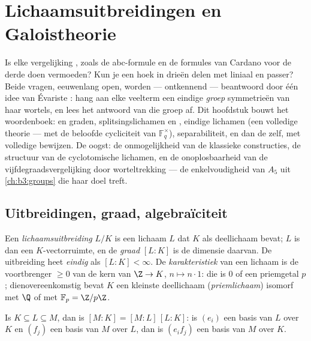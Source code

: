 \chapter{Lichaamsuitbreidingen en Galoistheorie}\label{ch:b3:galois}

Is elke vergelijking , zoals de
abc-formule en de formules van Cardano voor de derde  doen
vermoeden? Kun je een hoek in drieën delen met liniaal en passer?
Beide vragen, eeuwenlang open, worden --- ontkennend --- beantwoord
door één idee van Évariste : hang aan elke veelterm een
eindige \emph{groep} symmetrieën van haar wortels, en lees het
antwoord van die groep af. Dit hoofdstuk bouwt het woordenboek:
 en graden, splitsingslichamen en
, eindige lichamen (een volledige theorie
--- met de beloofde cycliciteit van $\mathbb F_q^\times$),
separabiliteit, en dan de  zelf, met volledige
bewijzen. De oogst: de onmogelijkheid van de klassieke
constructies, de structuur van de cyclotomische lichamen, en de
onoplosbaarheid van de vijfdegraadsvergelijking door
worteltrekking --- de enkelvoudigheid van $A_5$ uit
\cref{ch:b3:groups} die haar doel treft.

\section{Uitbreidingen, graad, algebraïciteit}

\begin{definition}\label{def:b3:galois:extension}
Een \emph{lichaamsuitbreiding} $L/K$ is
een lichaam $L$ dat $K$ als deellichaam bevat; $L$ is dan een
$K$-vectorruimte, en de \emph{graad} $[L:K]$ is de dimensie daarvan. De uitbreiding heet
\emph{eindig} als $[L:K] < \infty$. De \emph{karakteristiek} van
een lichaam is de voortbrenger $\geq 0$ van de kern van $\Z \to
K$, $n \mapsto n\cdot 1$: die is $0$ of een priemgetal $p$;
dienovereenkomstig bevat $K$ een kleinste deellichaam
(\emph{priemlichaam}) isomorf met $\Q$ of met $\mathbb F_p =
\Z/p\Z$.
\end{definition}

\begin{theorem}[Torenwet]\label{thm:b3:galois:tower}
Is $K \subseteq L \subseteq M$, dan is $[M:K] = [M:L]\,[L:K]$: is
$(e_i)$ een basis van $L$ over $K$ en $(f_j)$ een basis van $M$
over $L$, dan is $(e_if_j)$ een basis van $M$ over
$K$.
\end{theorem}

